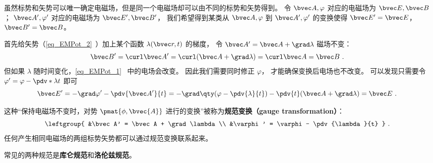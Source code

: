 
\begin{issues}
\issueDraft
\end{issues}


虽然标势和矢势可以唯一确定电磁场，但是同一个电磁场却可以由不同的标势和矢势得到。 令 $\bvec A, \varphi$ 对应的电磁场为 $\bvec E, \bvec B$； $\bvec A', \varphi'$ 对应的电磁场为 $\bvec E', \bvec B'$， 我们希望得到某类从 $\bvec A, \varphi$ 到 $\bvec A', \varphi'$ 的变换使得 $\bvec E' = \bvec E$， $\bvec B' = \bvec B$。

首先给矢势（\autoref{eq_EMPot_2}~）加上某个函数 $\lambda(\bvec r, t)$ 的梯度， 令 $\bvec A' = \bvec A + \grad\lambda$ 磁场不变：
\begin{equation}
\bvec B' = \curl \bvec A' = \curl (\bvec A + \grad \lambda) = \curl \bvec A = \bvec B~.
\end{equation}
但如果 $\lambda$ 随时间变化，\autoref{eq_EMPot_1}~ 中的电场会改变。 因此我们需要同时修正 $\varphi$， 才能确保变换后电场也不改变。 可以发现只需要令 $\varphi' = \varphi - \pdv*{\lambda}{t}$ 即可
\begin{equation}
\bvec E' = -\grad \varphi' - \pdv{\bvec A'}{t} = -\grad \qty(\varphi - \pdv{\lambda}{t}) - \pdv{t} (\bvec A + \grad \lambda) = \bvec E~.
\end{equation}


这种“保持电磁场不变时，对势 $\pmat{\phi, \bvec{A}}$ 进行的变换”被称为\textbf{规范变换（gauge transformation）}：
\begin{equation}\label{eq_Gauge_3}
\leftgroup{
&\bvec A' = \bvec A + \grad \lambda\\
&\varphi' = \varphi - \pdv{\lambda}{t}
}~.\end{equation}
任何产生相同电磁场的两组标势矢势都可以通过规范变换联系起来。

常见的两种规范是\textbf{库仑规范}和\textbf{洛伦兹规范}。
